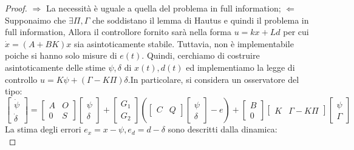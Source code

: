 \documentclass{article}
\theoremstyle{definition}
\begin{document}
\begin{proof}
    \(\Rightarrow \) La necessità è uguale a quella del problema in full information;\newline
    \(\Leftarrow \) Supponaimo che \(\exists \Pi,\Gamma \) che soddistano il lemma di Hautus e quindi il problema in full information, Allora il controllore fornito sarà nella forma \(u=kx+Ld\) per cui \(\dot{x}=(A+BK)x\) sia asintoticamente stabile. Tuttavia, non è implementabile poiche si hanno solo misure di \(e(t)\). Quindi, cerchiamo di costruire asintoticamente delle stime \(\psi,\delta \) di \(x(t),d(t)\) ed implementiamo la legge di controllo \(u=K\psi+(\Gamma-K\Pi)\delta \).\newline In particolare, si considera un osservatore del tipo:\begin{equation*}
        \begin{bmatrix}
            \dot{\psi }\\
            \dot{\delta}
        \end{bmatrix}=\begin{bmatrix}
            A & O \\ 0 & S
        \end{bmatrix}\begin{bmatrix}
            \psi \\\delta
        \end{bmatrix}+\begin{bmatrix}
            G_{1}\\G_{2}
        \end{bmatrix}\left(\begin{bmatrix}
            C&Q
        \end{bmatrix}\begin{bmatrix}
            \psi \\\delta
        \end{bmatrix}-e\right)+\begin{bmatrix}
            B\\0
        \end{bmatrix}\begin{bmatrix}
            K & \Gamma-K\Pi
        \end{bmatrix}\begin{bmatrix}
            \psi \\\Gamma
        \end{bmatrix}
    \end{equation*}
    La stima degli errori \(e_{x}=x-\psi , e_{d}=d-\delta \) sono descritti dalla dinamica:\begin{equation*}

\end{equation*}
\end{proof}
\end{document}
